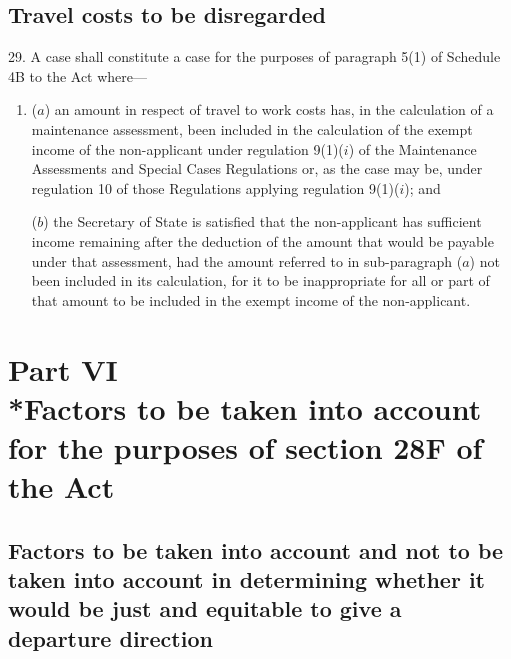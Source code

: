 \documentclass[12pt,a4paper]{article}
\begin{document}
\subsection[29. Travel costs to be disregarded]{Travel costs to be disregarded}

29. A case shall constitute a case for the
purposes of paragraph 5(1) of Schedule 4B to the Act where—
\begin{enumerate}\item[]
($a$) an amount in respect of travel to work costs has, in the calculation of a
maintenance assessment, been included in the calculation of the exempt income of
the non-applicant under regulation 9(1)($i$) of the Maintenance Assessments and
Special Cases Regulations or, as the case may be, under regulation 10 of those
Regulations applying regulation 9(1)($i$); and

($b$) the Secretary of State is satisfied that the non-applicant has sufficient
income remaining after the deduction of the amount that would be payable under
that assessment, had the amount referred to in sub-paragraph ($a$) not been
included in its calculation, for it to be inappropriate for all or part of that
amount to be included in the exempt income of the non-applicant.
\end{enumerate}

\section[Part VI --- Factors to be taken into account for the purposes of section 28F of the Act]{Part VI\\*Factors to be taken into account for the purposes of section 28F of the Act}

\renewcommand\parthead{--- Part VI}

\subsection[30. Factors to be taken into account and not to be taken into account in
determining whether it would be just and equitable to give a departure
direction]{Factors to be taken into account and not to be taken into account in
determining whether it would be just and equitable to give a departure
direction}
\end{document}
